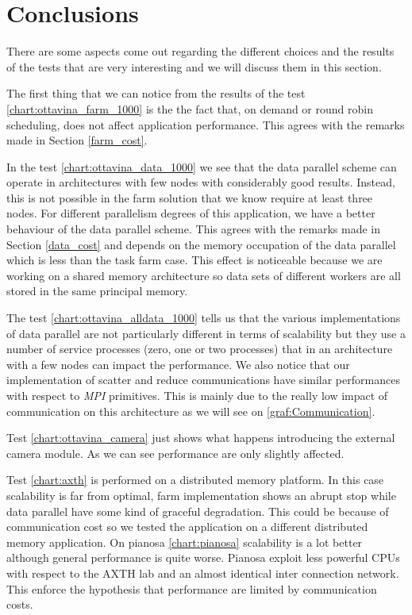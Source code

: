 \section{Conclusions}

There are some aspects come out regarding the different choices and the results of the tests that are very interesting and we will discuss them in this section.

The first thing that we can notice from the results of the test \ref{chart:ottavina_farm_1000} is the the fact that, on demand or round robin scheduling, does not affect application performance.
This agrees with the remarks made in Section \ref{farm_cost}.

In the test \ref{chart:ottavina_data_1000} we see that the data parallel scheme can operate in architectures with few nodes with considerably good results.
Instead, this is not possible in the farm solution that we know require at least three nodes. 
For different parallelism degrees of this application, we have a better behaviour of the data parallel scheme. 
This agrees with the remarks made in Section \ref{data_cost} and depends on the memory occupation of the data parallel which is less than the task farm case. 
This effect is noticeable because we are working on a shared memory architecture so data sets of different workers are all stored in the same principal memory.

The test \ref{chart:ottavina_alldata_1000} tells us that the various implementations of data parallel are not particularly different in terms of scalability but they use a number of service processes (zero, one or two processes) that in an architecture with a few nodes can impact the performance.
We also notice that our implementation of scatter and reduce communications have similar performances with respect to \textit{MPI} primitives.
This is mainly due to the really low impact of communication on this architecture as we will see on \ref{graf:Communication}.

Test \ref{chart:ottavina_camera} just shows what happens introducing the external camera module. 
As we can see performance are only slightly affected.

Test \ref{chart:axth} is performed on a distributed memory platform. 
In this case scalability is far from optimal, farm implementation shows an abrupt stop while data parallel have some kind of graceful degradation.
This could be because of communication cost so we tested the application on a different distributed memory application.
On pianosa \ref{chart:pianosa} scalability is a lot better although general performance is quite worse.
Pianosa exploit less powerful CPUs with respect to the AXTH lab and an almost identical inter connection network.
This enforce the hypothesis that performance are limited by communication costs.

